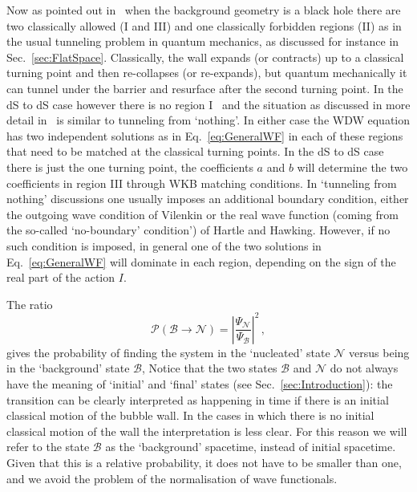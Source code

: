 \documentclass[a4paper,11pt]{article}
\numberwithin{equation}{section}
\begin{document}
Now as pointed out in~\cite{Blau:1986cw}  when the background geometry is a black hole there are two classically allowed (I and III) and one classically forbidden regions (II) as in the usual tunneling problem in quantum mechanics, as discussed for instance in Sec.~\ref{sec:FlatSpace}. Classically, the wall expands (or contracts) up to a classical turning point and then re-collapses (or re-expands), but quantum mechanically it can tunnel under the barrier and resurface after the second turning point.  In the dS to dS case however there is no region I~\cite{Bachlechner:2016mtp,deAlwis:2019dkc} and the situation as discussed in more detail in~\cite{deAlwis:2019dkc} is similar to tunneling from ‘nothing’. In either case the WDW equation has two independent solutions as in Eq.~\eqref{eq:GeneralWF} in each of these regions that need to be matched at the classical turning points. In the dS to dS case there is  just the one turning point, the coefficients $a$ and $b$ will determine the two coefficients in region III  through WKB matching conditions. In `tunneling from nothing' discussions one usually imposes an additional boundary condition, either the outgoing wave condition of  Vilenkin or the real wave function (coming from the so-called `no-boundary' condition') of Hartle and Hawking. However, if no such  condition is imposed, in general one of the two solutions in Eq.~\eqref{eq:GeneralWF} will dominate in each region, depending on the sign of the real part of   the action $I$. 

\noindent The ratio
\begin{equation}
\label{eq:GeneralDefProbability}
\mathcal{P}(\mathcal{B} \rightarrow \mathcal{N}) = \left|\frac{\Psi_{\mathcal{N}}}{\Psi_{\mathcal{B}}}\right|^2 \,,
\end{equation}
gives the probability of finding the system in the `nucleated' state $\mathcal{N}$ versus being in the `background' state $\mathcal{B}$, Notice that the two states $\mathcal{B}$ and $\mathcal{N}$ do not always have the meaning of `initial' and `final' states (see Sec.~\ref{sec:Introduction}): the transition can be clearly interpreted as happening in time if there is an initial classical motion of the bubble wall.  In the cases in which there is no initial classical motion of the wall the interpretation is less clear. For this reason we will refer to the state $\mathcal{B}$ as the `background' spacetime, instead of initial spacetime. Given that this is a  relative probability, it does not have to be smaller than one, and we avoid the problem of the normalisation of wave functionals.
\end{document}
